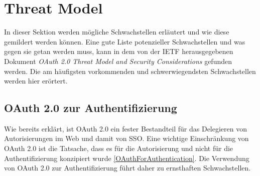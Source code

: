 


\section{Threat Model}

In dieser Sektion werden mögliche Schwachstellen erläutert und wie diese gemildert werden können. Eine gute Liste potenzieller Schwachstellen und was gegen sie getan werden muss, kann in dem von der IETF herausgegebenen Dokument \textit{OAuth 2.0 Threat Model and Security Considerations} \cite{RFC6819} gefunden werden. Die am häufigsten vorkommenden und schwerwiegendsten Schwachstellen werden hier erörtert. \cite{ssoProtocols}

\subsection{OAuth 2.0 zur Authentifizierung}

Wie bereits erklärt, ist OAuth 2.0 ein fester Bestandteil für das Delegieren von Autorisierungen im Web und damit von SSO. Eine wichtige Einschränkung von OAuth 2.0 ist die Tatsache, dass es für die Autorisierung und nicht für die Authentifizierung konzipiert wurde \ref{OAuthForAuthentication}. Die Verwendung von OAuth 2.0 zur Authentifizierung führt daher zu ernsthaften Schwachstellen.

